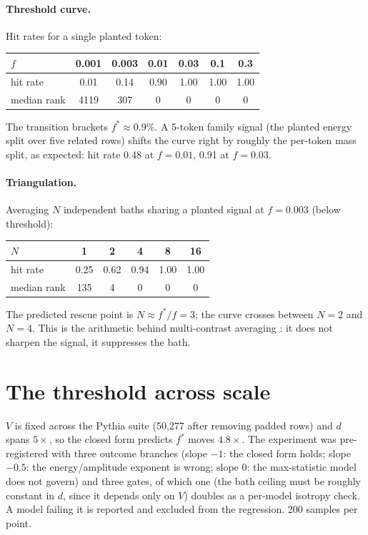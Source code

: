 \documentclass[11pt]{article}
\newcommand{\fstar}{f^{*}}
\begin{document}
\paragraph{Threshold curve.} Hit rates for a single planted token:

\begin{center}
\small
\begin{tabular}{lcccccc}
\toprule
$f$ & 0.001 & 0.003 & 0.01 & 0.03 & 0.1 & 0.3 \\
\midrule
hit rate & 0.01 & 0.14 & 0.90 & 1.00 & 1.00 & 1.00 \\
median rank & 4119 & 307 & 0 & 0 & 0 & 0 \\
\bottomrule
\end{tabular}
\end{center}

The transition brackets $\fstar \approx 0.9\%$. A 5-token family
signal (the planted energy split over five related rows) shifts the
curve right by roughly the per-token mass split, as expected: hit
rate 0.48 at $f{=}0.01$, 0.91 at $f{=}0.03$.

\paragraph{Triangulation.} Averaging $N$ independent baths sharing a
planted signal at $f = 0.003$ (below threshold):

\begin{center}
\small
\begin{tabular}{lccccc}
\toprule
$N$ & 1 & 2 & 4 & 8 & 16 \\
\midrule
hit rate & 0.25 & 0.62 & 0.94 & 1.00 & 1.00 \\
median rank & 135 & 4 & 0 & 0 & 0 \\
\bottomrule
\end{tabular}
\end{center}

The predicted rescue point is $N \approx \fstar/f = 3$; the curve
crosses between $N{=}2$ and $N{=}4$. This is the arithmetic behind
multi-contrast averaging \citep{tuomi2026contrastive}: it does not
sharpen the signal, it suppresses the bath.

\section{The threshold across scale}
\label{sec:scale}

$V$ is fixed across the Pythia suite (50{,}277 after removing padded
rows) and $d$ spans $5\times$, so the closed form predicts $\fstar$
moves $4.8\times$. The experiment was pre-registered with three
outcome branches (slope $-1$: the closed form holds; slope $-0.5$:
the energy/amplitude exponent is wrong; slope $0$: the max-statistic
model does not govern) and three gates, of which one (the bath
ceiling must be roughly constant in $d$, since it depends only on $V$)
doubles as a per-model isotropy check. A model failing it is
reported and excluded from the regression. 200 samples per point.
\end{document}
